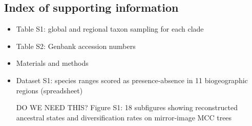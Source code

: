 \subsection{Index of supporting information}

\begin{itemize}
\item Table S1: global and regional taxon sampling for each clade
\item Table S2: Genbank accession numbers
\item Materials and methods
\item Dataset S1: species ranges scored as presence-absence in 11 biogeographic regions (spreadsheet)
\item [DO WE NEED THIS?] Figure S1: 18 subfigures showing reconstructed ancestral states and diversification rates on mirror-image MCC trees
\end{itemize}